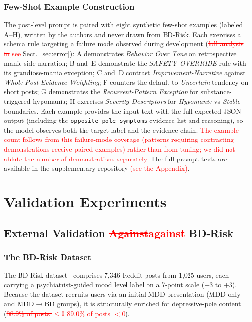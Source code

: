 \documentclass[runningheads]{llncs}
\newcommand{\rev}[1]{\textcolor{red}{#1}}
\newcommand{\del}[1]{\textcolor{red}{\sout{#1}}}
\newcommand{\rev}[1]{#1}
\newcommand{\del}[1]{}
\begin{document}
\subsubsection{Few-Shot Example Construction}
The post-level prompt is paired with eight synthetic few-shot examples (labeled A--H), written by the authors and never drawn from BD-Risk. Each exercises a schema rule targeting a failure mode observed during development (\del{full analysis in }\rev{see} Sect.~\ref{sec:error}): A demonstrates \emph{Behavior Over Tone} on retrospective manic-side narration; B and~E demonstrate the \emph{SAFETY OVERRIDE} rule with its grandiose-mania exception; C and~D contrast \emph{Improvement-Narrative} against \emph{Whole-Post Evidence Weighting}; F counters the default-to-\emph{Uncertain} tendency on short posts; G demonstrates the \emph{Recurrent-Pattern Exception} for substance-triggered hypomania; H exercises \emph{Severity Descriptors} for \emph{Hypomanic}-vs-\emph{Stable} boundaries. Each example provides the input text with the full expected JSON output (including the \texttt{opposite\_pole\_symptoms} evidence list and reasoning), so the model observes both the target label and the evidence chain. \rev{The example count follows from this failure-mode coverage (patterns requiring contrasting demonstrations receive paired examples) rather than from tuning; we did not ablate the number of demonstrations separately.} The full prompt texts are available in the supplementary repository \rev{(see the Appendix)}.

\section{Validation Experiments}

\subsection{External Validation \protect\del{Against}\protect\rev{against} BD-Risk}
\label{sec:valid}

\subsubsection{The BD-Risk Dataset}
The BD-Risk dataset~\cite{lee2024detecting} comprises 7,346 Reddit posts from 1,025 users, each carrying a psychiatrist-guided mood level label on a 7-point scale ($-3$ to $+3$). Because the dataset recruits users via an initial MDD presentation (MDD-only and MDD$\rightarrow$BD groups), it is structurally enriched for depressive-pole content (\del{88.9\% of posts $\leq 0$ }\rev{89.0\% of posts $< 0$}).
\end{document}

